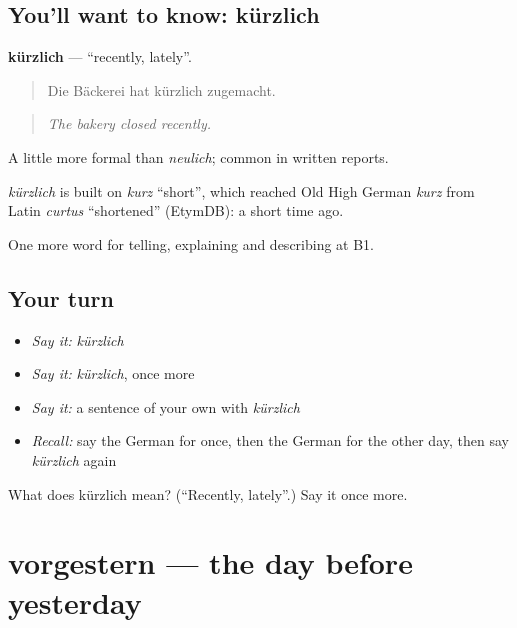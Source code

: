 \subsection*{You'll want to know: kürzlich}
\textbf{kürzlich} — \textquotedblleft{}recently, lately\textquotedblright{}.

\begin{quote}
Die Bäckerei hat kürzlich zugemacht.
\end{quote}

\begin{quote}
\emph{The bakery closed recently.}
\end{quote}

A little more formal than \emph{neulich}; common in written reports.

\begin{cousinweb}
\emph{kürzlich} is built on \emph{kurz} \textquotedblleft{}short\textquotedblright{}, which reached Old High German \emph{kurz} from Latin \emph{curtus} \textquotedblleft{}shortened\textquotedblright{} (EtymDB): a short time ago.
\end{cousinweb}

\begin{grammarlens}[title={What you've built}]
One more word for telling, explaining and describing at B1.
\end{grammarlens}

\subsection*{Your turn}
\begin{itemize}
\raggedright
  \item \emph{Say it:} \emph{kürzlich}
  \item \emph{Say it:} \emph{kürzlich}, once more
  \item \emph{Say it:} a sentence of your own with \emph{kürzlich}
  \item \emph{Recall:} say the German for once, then the German for the other day, then say \emph{kürzlich} again
\end{itemize}

\begin{tcolorbox}[breakable,colback=teal!4,colframe=teal!35!black,title={Before you move on}]
What does kürzlich mean? (\textquotedblleft{}Recently, lately\textquotedblright{}.) Say it once more.
\end{tcolorbox}
\section[vorgestern]{vorgestern — the day before yesterday}

